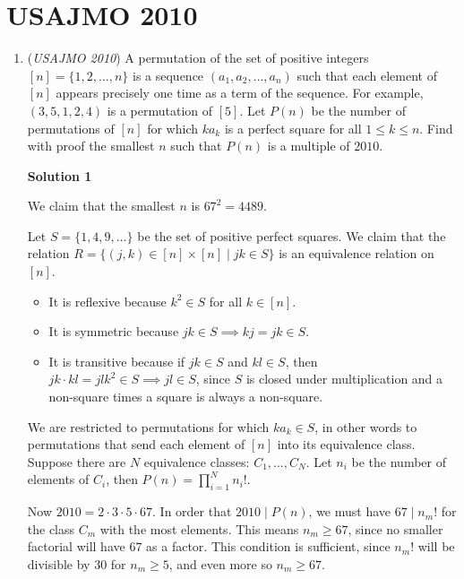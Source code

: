 \section{USAJMO 2010}
        \begin{enumerate}
        	\item (\textit{USAJMO 2010}) A permutation of the set of positive integers $[n] = \{1, 2, \ldots, n\}$ is a sequence $(a_1, a_2, \ldots, a_n)$ such that each element of $[n]$ appears precisely one time as a term of the sequence. For example, $(3, 5, 1, 2, 4)$ is a permutation of $[5]$. Let $P(n)$ be the number of permutations of $[n]$ for which $ka_k$ is a perfect square for all $1\leq k\leq n$. Find with proof the smallest $n$ such that $P(n)$ is a multiple of $2010$.


 



\textbf{Solution 1}

We claim that the smallest $n$ is $67^2 = \boxed{4489}$.

 Let $S = \{1, 4, 9, \ldots\}$ be the set of positive perfect squares. We claim that the relation $R = \{(j, k)\in [n]\times[n]\mid jk\in S\}$ is an equivalence relation on $[n]$.

 
            \begin{itemize}
        \item It is reflexive because $k^2\in S$ for all $k\in [n]$.
        \item It is symmetric because $jk\in S\implies kj = jk\in S$.
        \item It is transitive because if $jk\in S$ and $kl\in S$, then $jk\cdot kl = jlk^2\in S\implies jl\in S$, since $S$ is closed under multiplication and a non-square times a square is always a non-square.
            \end{itemize}
            We are restricted to permutations for which $ka_k \in S$, in other words to permutations that send each element of $[n]$ into its equivalence class. Suppose there are $N$ equivalence classes: $C_1, \ldots, C_N$. Let $n_i$ be the number of elements of $C_i$, then $P(n) = \prod_{i=1}^{N} n_i!$.

 Now $2010 = 2\cdot 3\cdot 5\cdot 67$. In order that $2010\mid P(n)$, we must have $67\mid n_m!$ for the class $C_m$ with the most elements. This means $n_m\geq 67$, since no smaller factorial will have $67$ as a factor. This condition is sufficient, since $n_m!$ will be divisible by $30$ for $n_m\geq 5$, and even more so $n_m\geq 67$.


\end{enumerate}
